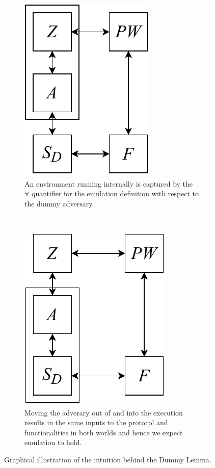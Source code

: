 \begin{figure}[t!]
	\begin{subfigure}[t]{0.2\textwidth}
	\centering
	\includegraphics[scale=0.5]{figures/dummylemma_pre.pdf}
	\caption{An environment running \A internally is captured by the $\forall$ quantifier for the emulation definition with respect to the dummy adversary.}
	\label{fig:dummy_pre}
	\end{subfigure}
	~
	\begin{subfigure}[t]{0.2\textwidth}
	\centering
	\includegraphics[scale=0.5]{figures/dummylemma_post.pdf}
	\caption{Moving the adverary out of \Z and into the execution results in the same inputs to the protocol and functionalities in both worlds and hence we expect emulation to hold.}
	\label{fig:dummy_post}
	\end{subfigure}
	\caption{Graphical illustration of the intuition behind the Dummy Lemma.}
	\label{fig:dummylemmas}
\end{figure}


